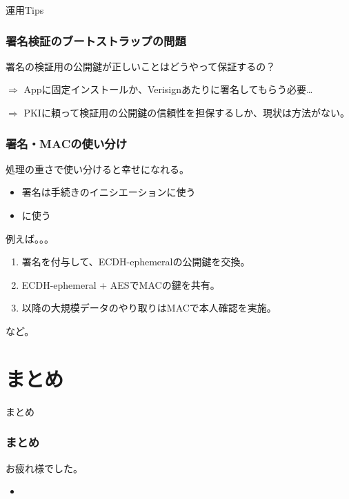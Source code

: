 \documentclass[12pt,dvipdfmx]{beamer}
\begin{document}
\begin{frame}
 {\Large 運用Tips}
\end{frame}

\begin{frame}
\frametitle{署名検証のブートストラップの問題}

\alert{署名の検証用の公開鍵が正しいことはどうやって保証するの？}

\vspace{2ex}

$\Rightarrow$ Appに固定インストールか、Verisignあたりに署名してもらう必要…

\vspace{2ex}

$\Rightarrow$ PKIに頼って検証用の公開鍵の信頼性を担保するしか、現状は方法がない。

\end{frame}

\begin{frame}
\frametitle{署名・MACの使い分け}
処理の重さで使い分けると幸せになれる。

\begin{itemize}
 \item \alert{署名は手続きのイニシエーション}に使う
 \item {}に使う
\end{itemize}

\vspace{2ex}

例えば。。。

\begin{enumerate}
\item 署名を付与して、ECDH-ephemeralの公開鍵を交換。
\item ECDH-ephemeral + AESでMACの鍵を共有。
\item 以降の大規模データのやり取りはMACで本人確認を実施。
\end{enumerate}

など。
\end{frame}


\section{まとめ}
\begin{frame}
 \centering
 {\Large まとめ}
\end{frame}

\begin{frame}
\frametitle{まとめ}
お疲れ様でした。

\begin{itemize}
\item 
\end{itemize}
\end{frame}
\end{document}
